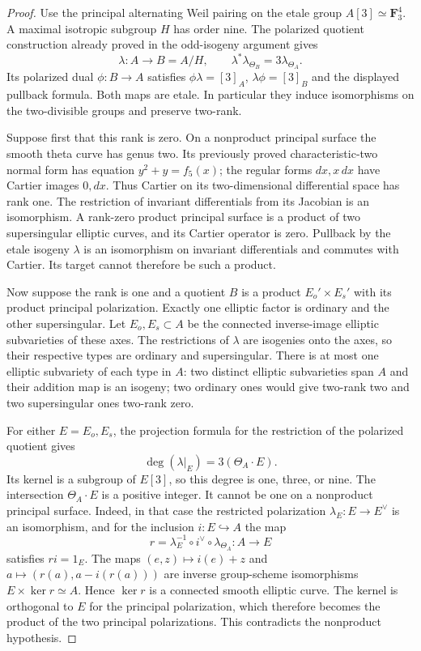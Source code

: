 \begin{proof}
Use the principal alternating Weil pairing on the etale group
$A[3]\simeq\mathbf F_3^4$. A maximal isotropic subgroup $H$ has
order nine. The polarized quotient construction already proved in
the odd-isogeny argument gives
\[
 \lambda:A\longrightarrow B=A/H,\qquad
 \lambda^*\lambda_{\Theta_B}=3\lambda_{\Theta_A}.
\]
Its polarized dual $\phi:B\to A$ satisfies
$\phi\lambda=[3]_A$, $\lambda\phi=[3]_B$ and the displayed
pullback formula. Both maps are etale. In particular they induce
isomorphisms on the two-divisible groups and preserve two-rank.

Suppose first that this rank is zero. On a nonproduct principal
surface the smooth theta curve has genus two. Its previously
proved characteristic-two normal form has equation $y^2+y=f_5(x)$;
the regular forms $dx,x\,dx$ have Cartier images $0,dx$.
Thus Cartier on its two-dimensional differential space has rank one.
The restriction of invariant differentials from its Jacobian is
an isomorphism. A rank-zero product principal surface is a product
of two supersingular elliptic curves, and its Cartier operator is
zero. Pullback by the etale isogeny $\lambda$ is an isomorphism on
invariant differentials and commutes with Cartier. Its target cannot
therefore be such a product.

Now suppose the rank is one and a quotient $B$ is a product
$E_o'\times E_s'$ with its product principal polarization. Exactly
one elliptic factor is ordinary and the other supersingular.
Let $E_o,E_s\subset A$ be the connected inverse-image elliptic
subvarieties of these axes. The restrictions of $\lambda$ are
isogenies onto the axes, so their respective types are ordinary
and supersingular. There is at most one elliptic subvariety of
each type in $A$: two distinct elliptic subvarieties span $A$ and
their addition map is an isogeny; two ordinary ones would give
two-rank two and two supersingular ones two-rank zero.

For either $E=E_o,E_s$, the projection formula for the restriction
of the polarized quotient gives
\[
             \deg(\lambda|_E)=3(\Theta_A\cdot E).
\]
Its kernel is a subgroup of $E[3]$, so this degree is one, three,
or nine. The intersection $\Theta_A\cdot E$ is a positive integer.
It cannot be one on a nonproduct principal surface. Indeed, in that
case the restricted polarization $\lambda_E:E\to E^\vee$ is an
isomorphism, and for the inclusion $i:E\hookrightarrow A$ the map
\[
 r=\lambda_E^{-1}\circ i^\vee\circ\lambda_{\Theta_A}:A\longrightarrow E
\]
satisfies $ri=1_E$. The maps $(e,z)\mapsto i(e)+z$ and
$a\mapsto(r(a),a-i(r(a)))$ are inverse group-scheme isomorphisms
$E\times\ker r\simeq A$. Hence $\ker r$ is a connected smooth
elliptic curve. The kernel is orthogonal to $E$ for the principal
polarization, which therefore becomes the product of the two
principal polarizations. This contradicts the nonproduct hypothesis.


\end{proof}
